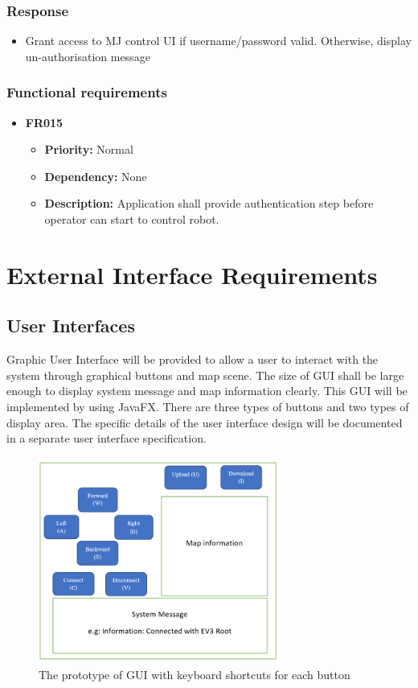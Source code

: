 \documentclass[10pt,a4paper,titlepage]{article}
\begin{document}
	\subsubsection*{Response}
	\begin{itemize}
		\item Grant access to MJ control UI if username/password valid. Otherwise, display un-authorisation message
	\end{itemize}
	
	\subsubsection{Functional requirements}
	\begin{itemize}
		\item \textbf{FR015}
		\begin{itemize}
			\item \textbf{Priority:} Normal
			\item \textbf{Dependency:} None
			\item \textbf{Description:} Application shall provide authentication step before operator can start to control robot.
		\end{itemize} 
		
	\end{itemize}
	
	\section{External Interface Requirements}
	\subsection{User Interfaces}
	Graphic User Interface will be provided to allow a user to interact with the system through graphical buttons and map scene. The size of GUI shall be large enough to display system message and map information clearly. This GUI will be implemented by using JavaFX. There are three types of buttons and two types of display area. The specific details of the user interface design will be documented in a separate user interface specification. 
	
	\begin{figure}[h]
		\centering
		\includegraphics[width=300px]{GUI.PNG}
		\caption{The prototype of GUI with keyboard shortcuts for each button}
		\label{fig:GUI with keyboard shortcuts}
	\end{figure}
	
\end{document}
